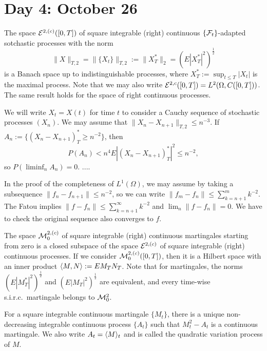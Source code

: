 \documentclass{../../../small}
\begin{document}
\newpage
\section{Day 4: October 26}

\begin{lem}
The space $\mathcal{E}^{2,(c)}([0,T])$ of square integrable (right) continuous $\{\mathcal{F}_t\}$-adapted sotchastic processes with the norm
\[\|X\|_{T,2}=\|\{X_t\}\|_{T,2}:=\|X^*_T\|_2=(E|X^*_T|^2)^{\frac12}\]
is a Banach space up to indistinguishable processes, where $X^*_T:=\sup_{t\le T}|X_t|$ is the maximal process.
Note that we may also write $\mathcal{E}^{2,c}([0,T])=L^2(\Omega,C([0,T]))$.
The same result holds for the space of right continuous processes.
\end{lem}
\begin{pf}
We will write $X_t=X(t)$ for time $t$ to consider a Cauchy sequence of stochastic processes $(X_n)$.
We may assume that $\|X_n-X_{n+1}\|_{T,2}\le n^{-3}$.
If $A_n:=\{(X_n-X_{n+1})^*_T\ge n^{-2}\}$, then
\[P(A_n)<n^4E|(X_n-X_{n+1})^*_T|^2\le n^{-2},\] so $P(\liminf_nA_n)=0$.
....
\end{pf}
\begin{rmk}
In the proof of the completeness of $L^1(\Omega)$, we may assume by taking a subsequence $\|f_n-f_{n+1}\|\le n^{-2}$, so we can write $\|f_m-f_n\|\le\sum_{k=n+1}^mk^{-2}$.
The Fatou implies $\|f-f_n\|\le\sum_{k=n+1}^\infty k^{-2}$ and $\lim_n\|f-f_n\|=0$.
We have to check the original sequence also converges to $f$.
\end{rmk}

\begin{lem}
The space $\mathcal{M}_0^{2,(c)}$ of square integrable (right) continuous martingales starting from zero is a closed subspace of the space $\mathcal{E}^{2,(c)}$ of square integrable (right) continuous processes.
If we consider $\mathcal{M}_0^{2,(c)}([0,T])$, then it is a Hilbert space with an inner product $\langle M,N\rangle:=EM_TN_T$.
Note that for martingales, the norms $(E|M_T^*|^2)^{\frac12}$ and $(E|M_T|^2)^{\frac12}$ are equivalent, and every time-wise s.i.r.c.~martingale belongs to $\mathcal{M}_0^2$.
\end{lem}

\begin{thm}
For a square integrable continuous martingale $\{M_t\}$, there is a unique non-decreasing integrable continuous process $\{A_t\}$ such that $M_t^2-A_t$ is a continuous martingale.
We also write $A_t=\langle M\rangle_t$ and is called the quadratic variation process of $M$.
\end{thm}
\begin{pf}

\end{pf}
\end{document}
